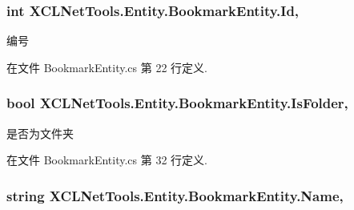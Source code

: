 \hypertarget{class_x_c_l_net_tools_1_1_entity_1_1_bookmark_entity_a827314c81aad0801f464f7359509baec}{
\subsubsection[{Id}]{\setlength{\rightskip}{0pt plus 5cm}int X\-C\-L\-Net\-Tools.\-Entity.\-Bookmark\-Entity.\-Id\hspace{0.3cm}{\ttfamily [get]}, {\ttfamily [set]}}}\label{class_x_c_l_net_tools_1_1_entity_1_1_bookmark_entity_a827314c81aad0801f464f7359509baec}


编号 



在文件 Bookmark\-Entity.\-cs 第 22 行定义.

\hypertarget{class_x_c_l_net_tools_1_1_entity_1_1_bookmark_entity_a025f1606c5b38103058567b3e08afe03}{
\subsubsection[{Is\-Folder}]{\setlength{\rightskip}{0pt plus 5cm}bool X\-C\-L\-Net\-Tools.\-Entity.\-Bookmark\-Entity.\-Is\-Folder\hspace{0.3cm}{\ttfamily [get]}, {\ttfamily [set]}}}\label{class_x_c_l_net_tools_1_1_entity_1_1_bookmark_entity_a025f1606c5b38103058567b3e08afe03}


是否为文件夹 



在文件 Bookmark\-Entity.\-cs 第 32 行定义.

\hypertarget{class_x_c_l_net_tools_1_1_entity_1_1_bookmark_entity_a89ccb517e285bfdd17981a72f590bc1c}{
\subsubsection[{Name}]{\setlength{\rightskip}{0pt plus 5cm}string X\-C\-L\-Net\-Tools.\-Entity.\-Bookmark\-Entity.\-Name\hspace{0.3cm}{\ttfamily [get]}, {\ttfamily [set]}}}\label{class_x_c_l_net_tools_1_1_entity_1_1_bookmark_entity_a89ccb517e285bfdd17981a72f590bc1c}


